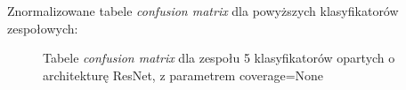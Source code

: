\documentclass[polish,12pt]{aghthesis}
\begin{document}
\noindent Znormalizowane tabele \textit{confusion matrix} dla powyższych klasyfikatorów zespołowych:
\begin{figure}[h!]%
    \begin{adjustbox}{minipage=1.0\paperwidth, pagecenter}
    \centering
    \qquad
    \end{adjustbox}
    \label{fig:resnet-ens-5-None-matrices}
    \caption{Tabele \textit{confusion matrix} dla zespołu 5 klasyfikatorów opartych o architekturę ResNet, z parametrem coverage=None}
\end{figure}
\end{document}
